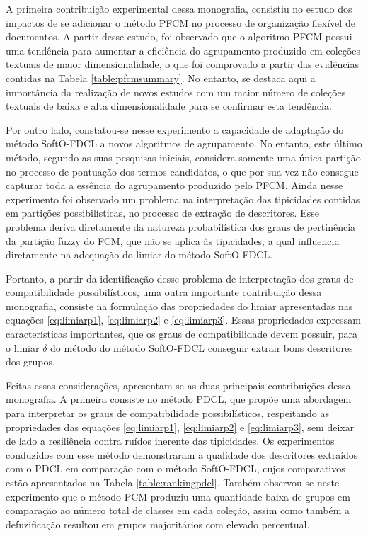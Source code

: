 A primeira contribuição experimental dessa monografia, consistiu no estudo dos impactos de se
adicionar o método PFCM no processo de organização flexível de documentos. A partir desse estudo,
foi observado que o algoritmo PFCM possui uma tendência para aumentar a eficiência do
agrupamento produzido em coleções textuais de maior dimensionalidade, o que foi comprovado a partir
das evidências contidas na Tabela \ref{table:pfcmsummary}. No entanto, se destaca aqui a importância
da realização de novos estudos com um maior número de coleções textuais de baixa e alta
dimensionalidade para se confirmar esta tendência. 

Por outro lado, constatou-se nesse experimento a capacidade de adaptação do método
SoftO-FDCL a novos algoritmos de agrupamento. No entanto, este último método, segundo as suas pesquisas iniciais, considera somente uma única
partição no processo de pontuação dos termos candidatos, o que por sua vez não consegue capturar
toda a essência do agrupamento produzido pelo PFCM. Ainda nesse experimento foi observado um
problema na interpretação das tipicidades contidas em partições possibilísticas, no processo de
extração de descritores. Esse problema deriva diretamente da natureza probabilística dos graus de
pertinência da partição fuzzy do FCM, que não se aplica às tipicidades, a qual influencia
diretamente na adequação do limiar do método SoftO-FDCL. 

Portanto, a partir da identificação desse problema de interpretação dos graus de compatibilidade
possibilísticos, uma outra importante contribuição dessa monografia, consiste na formulação das
propriedades do limiar apresentadas nas equações \ref{eq:limiarp1}, \ref{eq:limiarp2} e
\ref{eq:limiarp3}. Essas propriedades expressam características importantes, que os graus de
compatibilidade devem possuir, para o limiar $\delta$ do método do método SoftO-FDCL conseguir
extrair bons descritores dos grupos. 

Feitas essas considerações, apresentam-se as duas principais contribuições dessa monografia. A primeira consiste no
método PDCL, que propõe uma abordagem para interpretar os graus de compatibilidade possibilísticos,
respeitando as propriedades das equações \ref{eq:limiarp1}, \ref{eq:limiarp2} e \ref{eq:limiarp3},
sem deixar de lado a resiliência contra ruídos inerente das tipicidades. Os experimentos conduzidos
com esse método demonstraram a qualidade dos descritores extraídos com o PDCL em comparação com o
método SoftO-FDCL, cujos comparativos estão apresentados na Tabela \ref{table:rankingpdcl}. Também observou-se
neste experimento que o método PCM produziu uma quantidade baixa de grupos em comparação ao número
total de classes em cada coleção, assim como também a defuzificação resultou em grupos majoritários
com elevado percentual. %

